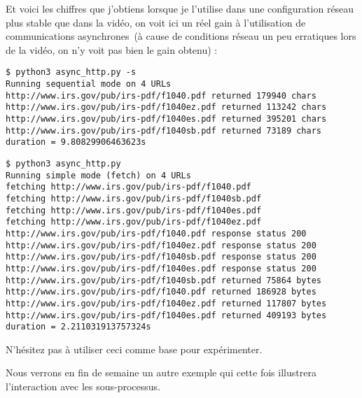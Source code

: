     Et voici les chiffres que j'obtiens lorsque je l'utilise dans une
configuration réseau plus stable que dans la vidéo, on voit ici un réel
gain à l'utilisation de communications asynchrones~(à cause de
conditions réseau un peu erratiques lors de la vidéo, on n'y voit pas
bien le gain obtenu) :

    \begin{verbatim}
$ python3 async_http.py -s
Running sequential mode on 4 URLs
http://www.irs.gov/pub/irs-pdf/f1040.pdf returned 179940 chars
http://www.irs.gov/pub/irs-pdf/f1040ez.pdf returned 113242 chars
http://www.irs.gov/pub/irs-pdf/f1040es.pdf returned 395201 chars
http://www.irs.gov/pub/irs-pdf/f1040sb.pdf returned 73189 chars
duration = 9.80829906463623s
\end{verbatim}

    \begin{verbatim}
$ python3 async_http.py
Running simple mode (fetch) on 4 URLs
fetching http://www.irs.gov/pub/irs-pdf/f1040.pdf
fetching http://www.irs.gov/pub/irs-pdf/f1040sb.pdf
fetching http://www.irs.gov/pub/irs-pdf/f1040es.pdf
fetching http://www.irs.gov/pub/irs-pdf/f1040ez.pdf
http://www.irs.gov/pub/irs-pdf/f1040.pdf response status 200
http://www.irs.gov/pub/irs-pdf/f1040ez.pdf response status 200
http://www.irs.gov/pub/irs-pdf/f1040sb.pdf response status 200
http://www.irs.gov/pub/irs-pdf/f1040es.pdf response status 200
http://www.irs.gov/pub/irs-pdf/f1040sb.pdf returned 75864 bytes
http://www.irs.gov/pub/irs-pdf/f1040.pdf returned 186928 bytes
http://www.irs.gov/pub/irs-pdf/f1040ez.pdf returned 117807 bytes
http://www.irs.gov/pub/irs-pdf/f1040es.pdf returned 409193 bytes
duration = 2.211031913757324s
\end{verbatim}

    N'hésitez pas à utiliser ceci comme base pour expérimenter.

Nous verrons en fin de semaine un autre exemple qui cette fois
illustrera l'interaction avec les sous-processus.


    
    
    
